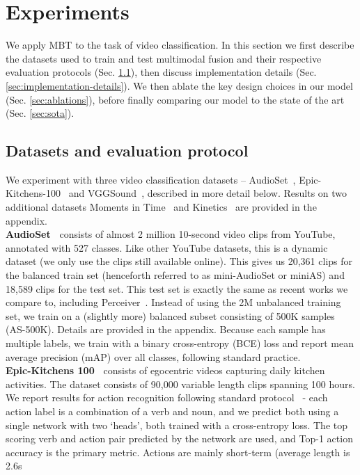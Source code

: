 \section{Experiments} 
We apply MBT to the task of video classification. In this section we first describe the datasets used to train and test multimodal fusion and their respective evaluation protocols (Sec. \ref{sec:datasets}), then discuss implementation details (Sec. \ref{sec:implementation-details}). We then ablate the key design choices in our model (Sec. \ref{sec:ablations}), before finally comparing our model to the state of the art (Sec. \ref{sec:sota}). 
\subsection{Datasets and evaluation protocol} \label{sec:datasets}
We experiment with three video classification datasets -- AudioSet~\cite{gemmeke2017audio}, Epic-Kitchens-100~\cite{damen2020rescaling} and VGGSound~\cite{chen2020vggsound}, described in more detail below. Results on two additional datasets Moments in Time~\cite{monfort2019moments} and Kinetics~\cite{kay2017kinetics} are provided in the appendix.   \\
\noindent\textbf{AudioSet~\cite{gemmeke2017audio}} consists of almost 2 million 10-second video clips from YouTube, annotated with 527 classes. Like other YouTube datasets, this is a dynamic dataset (we only use the clips still available online). This gives us 20,361 clips for the balanced train set (henceforth referred to as mini-AudioSet or miniAS) and 18,589 clips for the test set. This test set is exactly the same as recent works we compare to, including Perceiver~\cite{jaegle2021perceiver}. Instead of using the 2M unbalanced training set, we train on a (slightly more) balanced subset consisting of 500K samples (AS-500K). Details are provided in the appendix.
Because each sample has multiple labels, we train with a binary cross-entropy (BCE) loss and report mean average precision (mAP) over all classes, following standard practice. \\
\noindent\textbf{Epic-Kitchens 100~\cite{damen2020rescaling}} consists of egocentric videos capturing daily kitchen activities. The dataset consists of 90,000 variable length clips spanning 100 hours. We report results for action recognition following standard protocol~\cite{damen2020rescaling} - each action label is a combination of a verb and noun, and we predict both using a single network with two `heads', both trained with a cross-entropy loss. The top scoring verb and action pair predicted by the network are used, and Top-1 action accuracy is the primary metric. Actions are mainly short-term (average length is 2.6s
